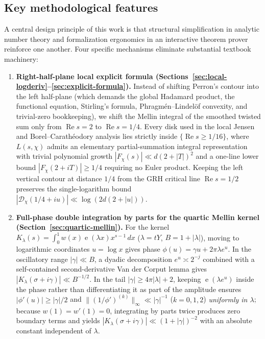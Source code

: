 \documentclass[11pt,reqno]{amsart}
\numberwithin{equation}{section}
\theoremstyle{definition}
\newcommand{\1}{\mathbf{1}}
\newcommand{\e}{\operatorname{e}}
\renewcommand{\Re}{\operatorname{Re}}
\newcommand{\GRH}{\textup{GRH}}
\begin{document}
\subsection{Key methodological features}
A central design principle of this work is that structural simplification in analytic number theory and formalization ergonomics in an interactive theorem prover reinforce one another. Four specific mechanisms eliminate substantial textbook machinery:

\begin{enumerate}[label=(\arabic*),leftmargin=2em]
  \item \textbf{Right-half-plane local explicit formula (Sections~\ref{sec:local-logderiv}--\ref{sec:explicit-formula}).}
  Instead of shifting Perron's contour into the left half-plane (which demands the global Hadamard product, the functional equation, Stirling's formula, Phragm\'en--Lindel\"of convexity, and trivial-zero bookkeeping), we shift the Mellin integral of the smoothed twisted sum only from $\Re s = 2$ to $\Re s = 1/4$. Every disk used in the local Jensen and Borel--Carath\'eodory analysis lies strictly inside $\{\Re s \ge 1/16\}$, where $L(s,\chi)$ admits an elementary partial-summation integral representation with trivial polynomial growth $|F_\chi(s)| \ll d(2+|T|)^2$ and a one-line lower bound $|F_\chi(2+iT)| \ge 1/4$ requiring no Euler product. Keeping the left vertical contour at distance $1/4$ from the \GRH{} critical line $\Re s = 1/2$ preserves the single-logarithm bound $|\mathcal{D}_\chi(1/4+iu)| \ll \log(2d(2+|u|))$.

  \item \textbf{Full-phase double integration by parts for the quartic Mellin kernel (Section~\ref{sec:quartic-mellin}).}
  For the kernel $K_\lambda(s) = \int_0^1 w(x)\e(\lambda x)x^{s-1}\,dx$ ($\lambda = tY$, $B = 1+|\lambda|$), moving to logarithmic coordinates $u = \log x$ gives phase $\phi(u) = \gamma u + 2\pi\lambda e^u$. In the oscillatory range $|\gamma| \ll B$, a dyadic decomposition $e^u \asymp 2^{-j}$ combined with a self-contained second-derivative Van der Corput lemma gives $|K_\lambda(\sigma+i\gamma)| \ll B^{-1/2}$. In the tail $|\gamma| \ge 4\pi|\lambda| + 2$, keeping $\e(\lambda e^u)$ inside the phase rather than differentiating it as part of the amplitude ensures $|\phi'(u)| \ge |\gamma|/2$ and $\|(1/\phi')^{(k)}\|_\infty \ll |\gamma|^{-1}$ ($k=0,1,2$) \emph{uniformly in $\lambda$}; because $w(1) = w'(1) = 0$, integrating by parts twice produces zero boundary terms and yields $|K_\lambda(\sigma+i\gamma)| \ll (1+|\gamma|)^{-2}$ with an absolute constant independent of $\lambda$.


\end{enumerate}
\end{document}
